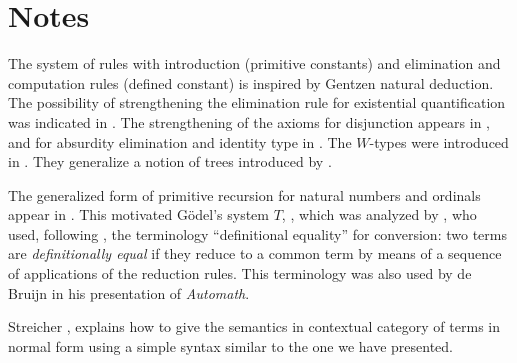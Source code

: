 \section*{Notes}\label{subsec:general-remarks}


  The system of rules with introduction (primitive constants) and elimination
  and computation rules (defined constant) is inspired by Gentzen natural
  deduction. The possibility of strengthening the elimination rule for
  existential quantification was indicated in \cite{Howard-1969}. The
  strengthening of the axioms for disjunction appears in \cite{Martin-Lof-1972},
  and for absurdity elimination and identity type in \cite{Martin-Lof-1973}. The
  $W$-types were introduced in \cite{Martin-Lof-1979}. They generalize a notion
  of trees introduced by \cite{Tait-1968}.

  The generalized form of primitive recursion for natural numbers and ordinals
  appear in \cite{Hilbert-1925}.  This motivated G\"odel's system $T$,
  \cite{Goedel-T-1958}, which was analyzed by \cite{Tait-1966}, who used,
  following \cite{Goedel-1958}, the terminology ``definitional equality'' for
  conversion: two terms are {\em definitionally equal} if they reduce to a
  common term by means of a sequence of applications of the reduction
  rules. This terminology was also used by de Bruijn \cite{deBruijn-1973} in his
  presentation of {\em Automath}.

  Streicher \cite[Theorem 4.13]{Streicher-1991}, explains how to give the
  semantics in contextual category of terms in normal form using a simple syntax
  similar to the one we have presented.

\egroup

